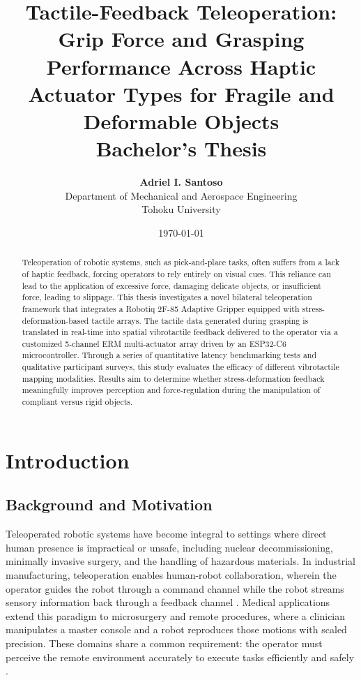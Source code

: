 \documentclass[12pt, a4paper]{report}
\title{
    \textbf{\Large Tactile-Feedback Teleoperation: Grip Force and Grasping Performance Across Haptic Actuator Types for Fragile and Deformable Objects}\\
    \vspace{1cm}
    \large Bachelor's Thesis
    \vspace{1cm}
}
\author{
    \textbf{Adriel I. Santoso}\\
    Department of Mechanical and Aerospace Engineering\\
    Tohoku University
}
\date{
    \vspace{2cm}
    \today
}
\begin{document}
\maketitle


\begin{abstract}
    Teleoperation of robotic systems, such as pick-and-place tasks, often suffers from a lack of haptic feedback, forcing operators to rely entirely on visual cues. This reliance can lead to the application of excessive force, damaging delicate objects, or insufficient force, leading to slippage. This thesis investigates a novel bilateral teleoperation framework that integrates a Robotiq 2F-85 Adaptive Gripper equipped with stress-deformation-based tactile arrays. The tactile data generated during grasping is translated in real-time into spatial vibrotactile feedback delivered to the operator via a customized 5-channel ERM multi-actuator array driven by an ESP32-C6 microcontroller. Through a series of quantitative latency benchmarking tests and qualitative participant surveys, this study evaluates the efficacy of different vibrotactile mapping modalities. Results aim to determine whether stress-deformation feedback meaningfully improves perception and force-regulation during the manipulation of compliant versus rigid objects.
\end{abstract}

\pagebreak
\tableofcontents
\listoffigures
\listoftables
\pagebreak


\chapter{Introduction}

\section{Background and Motivation}
Teleoperated robotic systems have become integral to settings where direct human presence is impractical or unsafe, including nuclear decommissioning, minimally invasive surgery, and the handling of hazardous materials. In industrial manufacturing, teleoperation enables human-robot collaboration, wherein the operator guides the robot through a command channel while the robot streams sensory information back through a feedback channel \cite{zheng2024}. Medical applications extend this paradigm to microsurgery and remote procedures, where a clinician manipulates a master console and a robot reproduces those motions with scaled precision. These domains share a common requirement: the operator must perceive the remote environment accurately to execute tasks efficiently and safely \cite{huang2019}.
\end{document}

